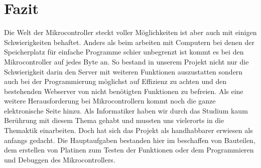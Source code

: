 \chapter{Fazit}

Die Welt der Mikrocontroller steckt voller Möglichkeiten ist aber auch mit
einigen Schwierigkeiten behaftet. Anders als beim arbeiten mit Computern bei
denen der Speicherplatz für einfache Programme schier unbegrenzt ist kommt es bei
den Mikrocontroller auf jedes Byte an. So bestand in unserem Projekt nicht nur
die Schwierigkeit darin den Server mit weiteren Funktionen auszustatten sondern
auch bei der Programmierung möglichst auf Effizienz zu achten und den
bestehenden Webserver von nicht benötigten Funktionen zu befreien. Als eine
weitere Herausforderung bei Mikrocontrollern kommt noch die ganze elektronische
Seite hinzu. Als Informatiker haben wir durch das Studium kaum Berührung mit
diesem Thema gehabt und mussten uns vielerorts in die Themaktik einarbeiten.
Doch hat sich das Projekt als handhabbarer erwiesen als anfangs gedacht. Die
Hauptaufgaben bestanden hier im beschaffen von Bauteilen, dem
erstellen von Platinen zum Testen der Funktionen oder dem Programmieren und
Debuggen des Mikrocontrollers.

